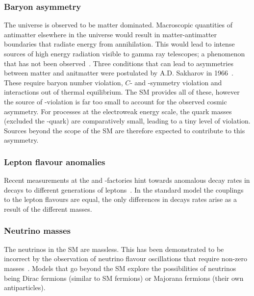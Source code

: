 \subsubsection{Baryon asymmetry} 

The universe is observed to be matter dominated. Macroscopic quantities of antimatter elsewhere in the universe would result in matter-antimatter boundaries that radiate energy from annihilation. This would lead to intense sources of high energy radiation visible to gamma ray telescopes; a phenomenon that has not been observed~\cite{vonBallmoos2014}. 
Three conditions that can lead to asymmetries between matter and anitmatter were postulated by A.D. Sakharov in 1966~\cite{Sakharov:1967dj}. These require baryon number violation, $C$- and \CP-symmetry violation and interactions out of thermal equilibrium. The SM provides all of these, however the source of \CP-violation is far too small to account for the observed cosmic asymmetry. For processes at the electroweak energy scale, the quark masses (excluded the \tquark-quark) are comparatively small, leading to a tiny level of \CP violation. Sources beyond the scope of the SM are therefore expected to contribute to this asymmetry. 

\subsubsection{Lepton flavour anomalies}
Recent measurements at the \lhc and \B-factories hint towards anomalous decay rates in decays to different generations of leptons~\cite{LHCb-PAPER-2017-013,LHCb-PAPER-2014-024}. In the standard model the couplings to the lepton flavours are equal, the only differences in decays rates arise as a result of the different masses.


\subsubsection{Neutrino masses} 
The neutrinos in the SM are massless. This has been demonstrated to be incorrect by the observation of neutrino flavour oscillations that require non-zero masses~\cite{PhysRevLett.81.1158,PhysRevLett.87.071301}. Models that go beyond the SM explore the possibilities of neutrinos being Dirac fermions (similar to SM fermions) or Majorana fermions (their own antiparticles). 

